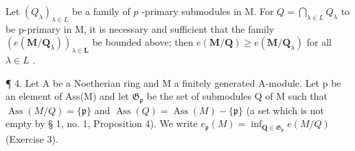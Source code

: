 Let \((Q_{\lambda})_{\lambda \in L}\) be a family of \(p\) -primary submodules in M. For \(Q = \bigcap_{\lambda \in L} Q_{\lambda}\) to be p-primary in M, it is necessary and sufficient that the family \((e(\mathbf{M}/\mathbf{Q}_{\lambda}))_{\lambda\in\mathbf{L}}\) be bounded above; then \(e(\mathbf{M}/\mathbf{Q})\geqslant e(\mathbf{M}/\mathbf{Q}_{\lambda})\) for all \(\lambda\in L\) .

¶ 4. Let A be a Noetherian ring and M a finitely generated A-module. Let p be an element of Ass(M) and let \(\mathfrak{G}_{\mathfrak{p}}\) be the set of submodules Q of M such that \(\operatorname{Ass}(M/Q) = \{\mathfrak{p}\}\) and \(\operatorname{Ass}(Q) = \operatorname{Ass}(M) - \{\mathfrak{p}\}\) (a set which is not empty by § 1, no. 1, Proposition 4). We write \(e_{\mathfrak{p}}(M) = \inf_{\mathbf{Q} \in \mathfrak{G}_{\mathfrak{p}}} e(M/Q)\) (Exercise 3).

